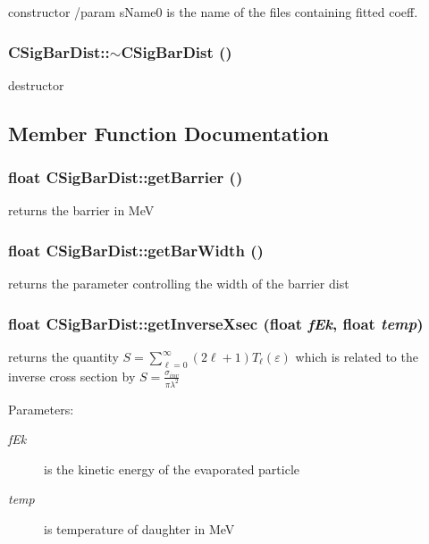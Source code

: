 constructor /param s\-Name0 is the name of the files containing fitted coeff. 
\subsubsection{\setlength{\rightskip}{0pt plus 5cm}CSig\-Bar\-Dist::$\sim$CSig\-Bar\-Dist ()}\label{classCSigBarDist_bf984b4157ee3f414f683e6e5187b7e9}


destructor 

\subsection{Member Function Documentation}
\subsubsection{\setlength{\rightskip}{0pt plus 5cm}float CSig\-Bar\-Dist::get\-Barrier ()}\label{classCSigBarDist_fca88f547fd3cdd8901b6e4ad27726c3}


returns the barrier in Me\-V 
\subsubsection{\setlength{\rightskip}{0pt plus 5cm}float CSig\-Bar\-Dist::get\-Bar\-Width ()\hspace{0.3cm}{\tt  [static]}}\label{classCSigBarDist_52ec33821f2367cf05eb72d052c01d88}


returns the parameter controlling the width of the barrier dist 
\subsubsection{\setlength{\rightskip}{0pt plus 5cm}float CSig\-Bar\-Dist::get\-Inverse\-Xsec (float {\em f\-Ek}, float {\em temp})}\label{classCSigBarDist_208b57a94504830b93649c2927ce39f1}


returns the quantity $S=\sum_{\ell=0}^{\infty} (2\ell+1)T_{\ell}(\varepsilon)$ which is related to the inverse cross section by $S=\frac{\sigma_{inv}}{\pi\lambda^{2}}$ \begin{Desc}
\item[Parameters:]
\begin{description}
\item[{\em f\-Ek}]is the kinetic energy of the evaporated particle \item[{\em temp}]is temperature of daughter in Me\-V \end{description}
\end{Desc}
